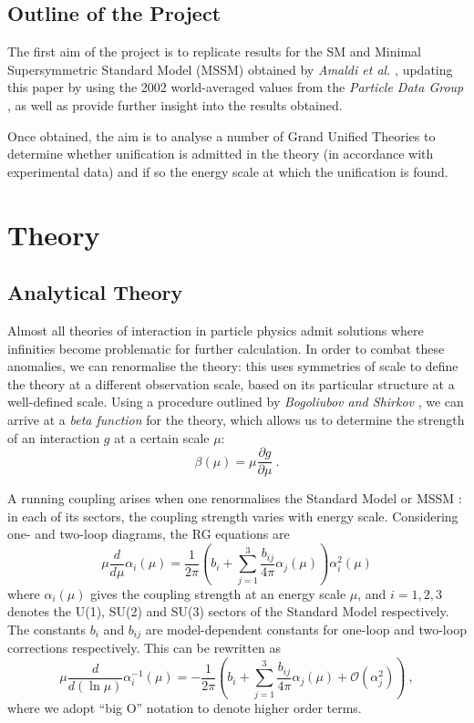 \documentclass[12pt,a4paper,oneside]{article}
\begin{document}
\subsection{Outline of the Project}
The first aim of the project is to replicate results for the SM and Minimal Supersymmetric Standard Model (MSSM) obtained by \textit{Amaldi et al.} \cite{amaldi}, updating this paper by using the 2002 world-averaged values from the \textit{Particle Data Group} \cite{pdg}, as well as provide further insight into the results obtained.

Once obtained, the aim is to analyse a number of Grand Unified Theories to determine whether unification is admitted in the theory (in accordance with experimental data) and if so the energy scale at which the unification is found.

\section{Theory}

\subsection{Analytical Theory}

Almost all theories of interaction in particle physics admit solutions where infinities become problematic for further calculation. In order to combat these anomalies, we can renormalise the theory: this uses symmetries of scale to define the theory at a different observation scale, based on its particular structure at a well-defined scale. Using a procedure outlined by \textit{Bogoliubov and Shirkov} \cite{bogoliubov}, we can arrive at a \textit{beta function} for the theory, which allows us to determine the strength of an interaction $g$ at a certain scale $\mu$:
\[
\beta (\mu) = \mu \frac{\partial g}{\partial \mu} \:.
\]

A running coupling arises when one renormalises the Standard Model or MSSM \cite{renorm, renorm-2}: in each of its sectors, the coupling strength varies with energy scale. Considering one- and two-loop diagrams, the RG equations are \cite{amaldi}
\[
\mu \dfrac{d}{d \mu} \alpha_i (\mu) = \dfrac{1}{2 \pi} \left( b_i + \sum_{j=1}^{3} \dfrac{b_{i j}}{4 \pi} \alpha_j (\mu) \right) \alpha_i^2 (\mu)
\]
where $\alpha_i (\mu)$ gives the coupling strength at an energy scale $\mu$, and $i = 1,2,3$ denotes the U(1), SU(2) and SU(3) sectors of the Standard Model respectively. The constants $b_i$ and $b_{ij}$ are model-dependent constants for one-loop and two-loop corrections respectively. This can be rewritten as
\begin{equation}
\mu \dfrac{d}{d (\ln \mu)} \alpha_i^{-1} (\mu) = -\dfrac{1}{2 \pi} \left( b_i + \sum_{j=1}^{3} \dfrac{b_{i j}}{4 \pi} \alpha_j (\mu) + \mathcal{O}(\alpha_j^2) \right) \:,
\label{eqn:rg}
\end{equation}
where we adopt ``big O'' notation to denote higher order terms.
\end{document}
